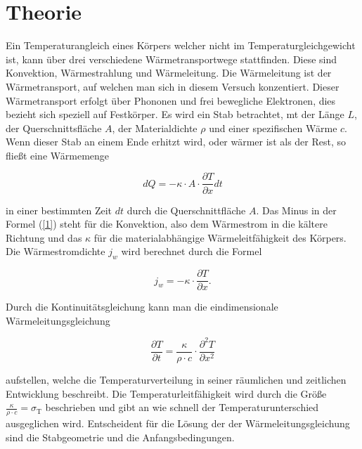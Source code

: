 \section{Theorie}

\begin{flushleft}
    Ein Temperaturangleich eines Körpers welcher nicht im Temperaturgleichgewicht ist, kann über drei verschiedene Wärmetransportwege stattfinden. 
    Diese sind Konvektion, Wärmestrahlung und Wärmeleitung. 
    Die Wärmeleitung ist der Wärmetransport, auf welchen man sich in diesem Versuch konzentiert.
    Dieser Wärmetransport erfolgt über Phononen und frei bewegliche Elektronen, dies bezieht sich speziell auf Festkörper.
    Es wird ein Stab betrachtet, mt der Länge $ L $, der Querschnittsfläche $ A $, der Materialdichte $ \rho $ und einer spezifischen Wärme $ c $.
    Wenn dieser Stab an einem Ende erhitzt wird, oder wärmer ist als der Rest, so fließt eine Wärmemenge 
\end{flushleft}

\begin{equation}
    dQ = -\kappa \cdot A \cdot \frac{\partial T}{\partial x}dt \label{1}
\end{equation}

\begin{flushleft}
    in einer bestimmten Zeit $ dt $ durch die Querschnittfläche $ A $.
    Das Minus in der Formel (\ref{1}) steht für die Konvektion, also dem Wärmestrom in die kältere Richtung und das $ \kappa $ für die materialabhängige Wärmeleitfähigkeit des Körpers.
    Die Wärmestromdichte $ j_{w} $ wird berechnet durch die Formel
\end{flushleft}

\begin{equation}
    j_{w} = -\kappa \cdot \frac{\partial T}{\partial x}.\label{2}
\end{equation}
 
\begin{flushleft}
    Durch die Kontinuitätsgleichung kann man die eindimensionale Wärmeleitungsgleichung 
\end{flushleft}

\begin{equation}
    \frac{\partial T}{\partial t} = \frac{\kappa}{\rho \cdot c} \cdot \frac{\partial^2 T} {\partial x^2}\label{3}
\end{equation}

\begin{flushleft}
    aufstellen, welche die Temperaturverteilung in seiner räumlichen und zeitlichen Entwicklung beschreibt.
    Die Temperaturleitfähigkeit wird durch die Größe $ \frac{\kappa}{\rho \cdot c} = \sigma_{\text{T}}  $ beschrieben und gibt an wie schnell der Temperaturunterschied ausgeglichen wird.
    Entscheident für die Lösung der der Wärmeleitungsgleichung sind die Stabgeometrie und die Anfangsbedingungen. 
\end{flushleft}

